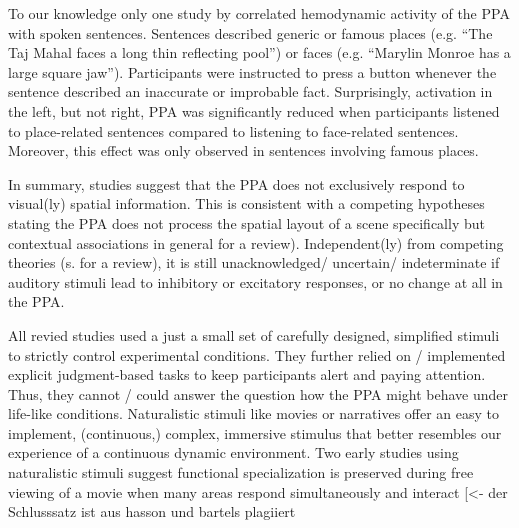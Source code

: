 \documentclass[english]{article}
\begin{document}
To our knowledge only one study by \citep{aziz2008modulation} correlated hemodynamic activity of the PPA with spoken sentences. Sentences described generic or famous places (e.g. ``The Taj Mahal faces a long thin reflecting pool'') or faces  (e.g. ``Marylin Monroe has a large square jaw''). Participants were instructed to press a button whenever the sentence described an inaccurate or improbable fact. Surprisingly, activation in the left, but not right, PPA was significantly reduced when participants listened to place-related sentences compared to listening to face-related sentences. Moreover, this effect was only observed in sentences involving famous places.

In summary, studies suggest that the PPA does not exclusively respond to visual(ly) spatial information. This is consistent with a competing hypotheses stating the PPA does not process the spatial layout of a scene specifically but contextual associations in general \citep{aminoff2006parahippocampal} for a review). Independent(ly) from competing theories (s. \citep{aminoff2013role} for a review), it is still unacknowledged/ uncertain/ indeterminate if auditory stimuli lead to inhibitory or excitatory responses, or no change at all in the PPA.

All revied studies used a just a small set of carefully designed, simplified stimuli to strictly control experimental conditions. They further relied on / implemented explicit judgment-based tasks to keep participants alert and paying attention. Thus, they cannot / could answer the question how the PPA might behave under life-like conditions.
Naturalistic stimuli like movies \citep{hasson2008neurocinematics, sonkusare2019naturalistic} or narratives \citep{honey2012not, lerner2011topographic, silbert2014coupled} offer an easy to implement, (continuous,) complex, immersive stimulus that better resembles our experience of a continuous dynamic environment.
Two early studies using naturalistic stimuli suggest functional specialization is preserved during free viewing of a movie when many areas respond simultaneously and interact [<- der Schlusssatz ist aus hasson und bartels plagiiert \citep{bartels2004mapping, hasson2004intersubject}
\end{document}

